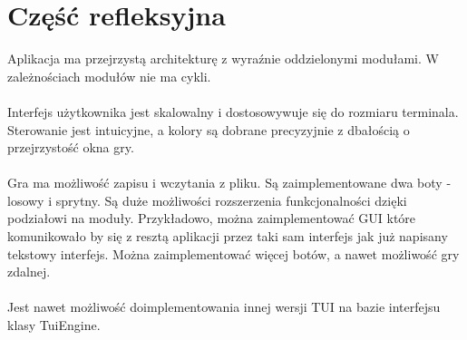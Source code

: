 \documentclass[12pt, titlepage]{article}
\begin{document}
\section{Część refleksyjna}
Aplikacja ma przejrzystą architekturę z wyraźnie
oddzielonymi modułami. W zależnościach modułów nie
ma cykli. 
\\~\\
Interfejs użytkownika jest skalowalny i dostosowywuje się
do rozmiaru terminala. Sterowanie jest intuicyjne, a kolory
są dobrane precyzyjnie z dbałością o przejrzystość okna gry.
\\~\\
Gra ma możliwość zapisu i wczytania z pliku. Są zaimplementowane
dwa boty - losowy i sprytny. Są duże możliwości rozszerzenia
funkcjonalności dzięki podziałowi na moduły. Przykładowo, można
zaimplementować GUI które komunikowało by
się z resztą aplikacji przez taki sam interfejs jak już
napisany tekstowy interfejs. Można
zaimplementować więcej botów, a nawet możliwość gry zdalnej.
\\~\\
Jest nawet możliwość doimplementowania innej wersji TUI na
bazie interfejsu klasy TuiEngine.
\end{document}
